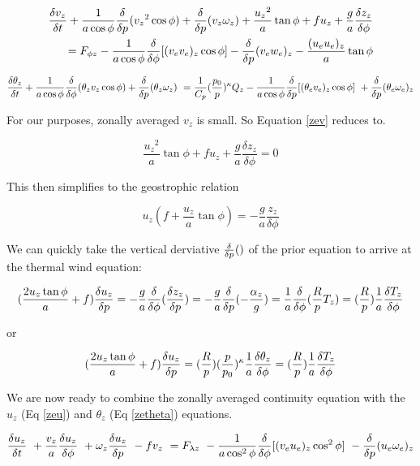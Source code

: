 \documentclass{article}
\begin{document}
\begin{eqnarray}
\frac{\delta v_z}{\delta t} + \frac{1}{a\cos{\phi}} \frac{\delta}{\delta p} ({v_z}^2 \cos \phi ) + \frac{\delta}{\delta p} (v_z \omega_z) 
+ \frac{{u_z}^2}{a} \tan{\phi} +fu_z + \frac{g}{a} \frac{\delta z_z}{\delta \phi} 
\\
= F_{\phi z} - \frac{1}{a\cos{\phi}} \frac{\delta}{\delta \phi} [ (v_e v_e)_z \cos \phi ] 
- \frac{\delta}{\delta p} (v_e w_e)_z - \frac{(u_e u_e)_z}{a} \tan \phi
\label{zev}
\end{eqnarray}

\begin{equation}
\frac{\delta \theta_z}{\delta t} + \frac{1}{a\cos{\phi}} \frac{\delta}{\delta \phi} (\theta_z v_z \cos \phi ) + \frac{\delta}{\delta p} (\theta_z \omega_z) \
= \frac{1}{C_p} (\frac{p_0}{p})^\kappa Q_z - \frac{1}{a\cos{\phi}} \frac{\delta}{\delta p} [ (\theta_e v_e)_z \cos {\phi} ] \
+ \frac{\delta}{\delta p} (\theta_e \omega_e )_z
\label{zetheta}
\end{equation}

For our purposes, zonally averaged $v_z$ is small.  So Equation \ref{zev} reduces to.

\begin{equation}
\frac{{u_z}^2}{a} \tan{\phi} +fu_z + \frac{g}{a} \frac{\delta z_z}{\delta \phi} = 0
\end{equation}

This then simplifies to the geostrophic relation

\begin{equation}
u_z (f + \frac{u_z}{a}\tan \phi ) = - \frac{g}{a}\frac{z_z}{\delta \phi}
\end{equation}

We can quickly take the vertical derviative $\frac{\delta}{\delta p} ()$ of the prior equation to
arrive at the thermal wind equation:

\begin{equation}
(\frac{2u_z \tan{\phi}}{a} + f) \frac{\delta u_z}{\delta p} = - \frac{g}{a} \frac{\delta}{\delta \phi} (\frac{\delta z_z}{\delta p})
= - \frac{g}{a} \frac{\delta}{\delta p} (- \frac{\alpha_z}{g}) = \frac{1}{a} \frac{\delta}{\delta \phi}(\frac{R}{p} T_z) = (\frac{R}{p}) \frac{1}{a} \frac{\delta T_z}{\delta \phi} 
\label{thermal}
\end{equation}

or 

\begin{equation}
(\frac{2u_z \tan{\phi}}{a} + f) \frac{\delta u_z}{\delta p} = (\frac{R}{p}) (\frac{p}{p_0})^\kappa \frac{1}{a} \frac{\delta \theta_z}{\delta \phi} = (\frac{R}{p}) \frac{1}{a} \frac{\delta T_z}{\delta \phi} 
\end{equation}

We are now ready to combine the zonally averaged continuity equation
with the $u_z$ (Eq \ref{zeu}) and $\theta_z$ (Eq \ref{zetheta}) equations.

\begin{equation}
\frac{\delta u_z}{\delta t} \
+ \frac{v_z}{a} \frac{\delta u_z}{\delta \phi} \
+ \omega_z \frac{\delta u_z}{\delta p} \
- fv_z \
= F_{\lambda z} \
- \frac{1}{a\cos^2{\phi}} \frac{\delta}{\delta \phi} [ ( v_e u_e )_z \cos^2 \phi ] \
- \frac{\delta}{\delta p} (u_e \omega_e )_z
\label{combineu}
\end{equation}
\end{document}
